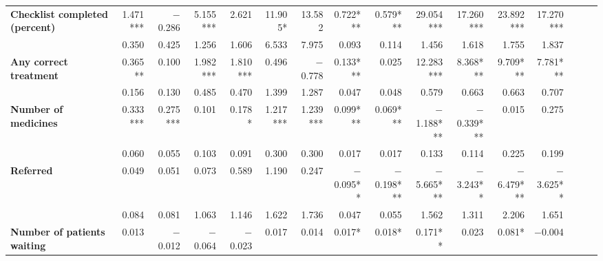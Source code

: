 \begin{tabular}{@{\extracolsep{5pt}}lrrrrrrrrrrrrrrr}
{\bf Checklist completed (percent)} & 1.471*** & $-$0.286\phantom{***} & 5.155*** & 2.621\phantom{***} & 11.905*\phantom{**} & 13.582\phantom{***} & 0.722*** & 0.579*** & 29.054*** & 17.260*** & 23.892*** & 17.270*** \\
{\bf } & 0.350\phantom{***} & 0.425\phantom{***} & 1.256\phantom{***} & 1.606\phantom{***} & 6.533\phantom{***} & 7.975\phantom{***} & 0.093\phantom{***} & 0.114\phantom{***} & 1.456\phantom{***} & 1.618\phantom{***} & 1.755\phantom{***} & 1.837\phantom{***} \\
{\bf Any correct treatment} & 0.365**\phantom{*} & 0.100\phantom{***} & 1.982*** & 1.810*** & 0.496\phantom{***} & $-$0.778\phantom{***} & 0.133*** & 0.025\phantom{***} & 12.283*** & 8.368*** & 9.709*** & 7.781*** \\
{\bf } & 0.156\phantom{***} & 0.130\phantom{***} & 0.485\phantom{***} & 0.470\phantom{***} & 1.399\phantom{***} & 1.287\phantom{***} & 0.047\phantom{***} & 0.048\phantom{***} & 0.579\phantom{***} & 0.663\phantom{***} & 0.663\phantom{***} & 0.707\phantom{***} \\
{\bf Number of medicines} & 0.333*** & 0.275*** & 0.101\phantom{***} & 0.178*\phantom{**} & 1.217*** & 1.239*** & 0.099*** & 0.069*** & $-$1.188*** & $-$0.339*** & 0.015\phantom{***} & 0.275\phantom{***} \\
{\bf } & 0.060\phantom{***} & 0.055\phantom{***} & 0.103\phantom{***} & 0.091\phantom{***} & 0.300\phantom{***} & 0.300\phantom{***} & 0.017\phantom{***} & 0.017\phantom{***} & 0.133\phantom{***} & 0.114\phantom{***} & 0.225\phantom{***} & 0.199\phantom{***} \\
{\bf Referred} & 0.049\phantom{***} & 0.051\phantom{***} & 0.073\phantom{***} & 0.589\phantom{***} & 1.190\phantom{***} & 0.247\phantom{***} & $-$0.095**\phantom{*} & $-$0.198*** & $-$5.665*** & $-$3.243**\phantom{*} & $-$6.479*** & $-$3.625**\phantom{*} \\
{\bf } & 0.084\phantom{***} & 0.081\phantom{***} & 1.063\phantom{***} & 1.146\phantom{***} & 1.622\phantom{***} & 1.736\phantom{***} & 0.047\phantom{***} & 0.055\phantom{***} & 1.562\phantom{***} & 1.311\phantom{***} & 2.206\phantom{***} & 1.651\phantom{***} \\
{\bf Number of patients waiting} & 0.013\phantom{***} & $-$0.012\phantom{***} & $-$0.064\phantom{***} & $-$0.023\phantom{***} & 0.017\phantom{***} & 0.014\phantom{***} & 0.017*\phantom{**} & 0.018*\phantom{**} & 0.171**\phantom{*} & 0.023\phantom{***} & 0.081*\phantom{**} & $-$0.004\phantom{***} \\

\end{tabular}
